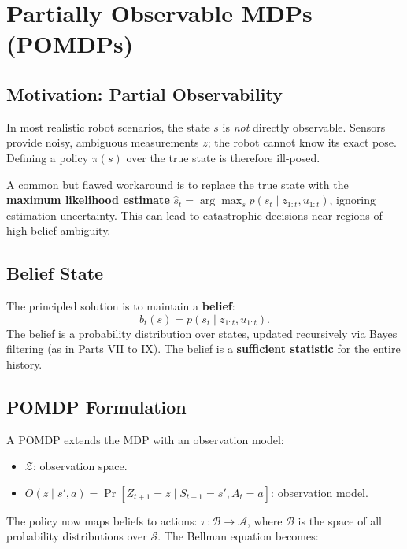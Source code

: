 \documentclass[11pt,a4paper]{article}
\theoremstyle{definition}
\theoremstyle{plain}
\theoremstyle{remark}
\begin{document}
\section{Partially Observable MDPs (POMDPs)}

\subsection{Motivation: Partial Observability}

In most realistic robot scenarios, the state $s$ is \emph{not} directly observable. Sensors provide noisy, ambiguous measurements $z$; the robot cannot know its exact pose. Defining a policy $\pi(s)$ over the true state is therefore ill-posed.

A common but flawed workaround is to replace the true state with the \textbf{maximum likelihood estimate} $\hat{s}_t = \arg\max_s p(s_t \mid z_{1:t}, u_{1:t})$, ignoring estimation uncertainty. This can lead to catastrophic decisions near regions of high belief ambiguity.

\subsection{Belief State}

The principled solution is to maintain a \textbf{belief}:
\[
    b_t(s) = p(s_t \mid z_{1:t}, u_{1:t}).
\]
The belief is a probability distribution over states, updated recursively via Bayes filtering (as in Parts VII to IX). The belief is a \textbf{sufficient statistic} for the entire history.

\subsection{POMDP Formulation}

A POMDP extends the MDP with an observation model:
\begin{itemize}
    \item $\mathcal{Z}$: observation space.
    \item $O(z \mid s', a) = \Pr[Z_{t+1} = z \mid S_{t+1} = s', A_t = a]$: observation model.
\end{itemize}

The policy now maps beliefs to actions: $\pi : \mathcal{B} \to \mathcal{A}$, where $\mathcal{B}$ is the space of all probability distributions over $\mathcal{S}$. The Bellman equation becomes:
\end{document}
